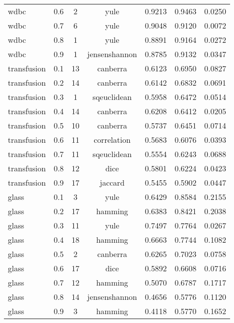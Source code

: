 \begin{table}[ht]
\begin{tabular}{lcccccc}
wdbc & 0.6 & 2 & yule & 0.9213 & 0.9463 & 0.0250 \\
wdbc & 0.7 & 6 & yule & 0.9048 & 0.9120 & 0.0072 \\
wdbc & 0.8 & 1 & yule & 0.8891 & 0.9164 & 0.0272 \\
wdbc & 0.9 & 1 & jensenshannon & 0.8785 & 0.9132 & 0.0347 \\
transfusion & 0.1 & 13 & canberra & 0.6123 & 0.6950 & 0.0827 \\
transfusion & 0.2 & 14 & canberra & 0.6142 & 0.6832 & 0.0691 \\
transfusion & 0.3 & 1 & sqeuclidean & 0.5958 & 0.6472 & 0.0514 \\
transfusion & 0.4 & 14 & canberra & 0.6208 & 0.6412 & 0.0205 \\
transfusion & 0.5 & 10 & canberra & 0.5737 & 0.6451 & 0.0714 \\
transfusion & 0.6 & 11 & correlation & 0.5683 & 0.6076 & 0.0393 \\
transfusion & 0.7 & 11 & sqeuclidean & 0.5554 & 0.6243 & 0.0688 \\
transfusion & 0.8 & 12 & dice & 0.5801 & 0.6224 & 0.0423 \\
transfusion & 0.9 & 17 & jaccard & 0.5455 & 0.5902 & 0.0447 \\
glass & 0.1 & 3 & yule & 0.6429 & 0.8584 & 0.2155 \\
glass & 0.2 & 17 & hamming & 0.6383 & 0.8421 & 0.2038 \\
glass & 0.3 & 11 & yule & 0.7497 & 0.7764 & 0.0267 \\
glass & 0.4 & 18 & hamming & 0.6663 & 0.7744 & 0.1082 \\
glass & 0.5 & 2 & canberra & 0.6265 & 0.7023 & 0.0758 \\
glass & 0.6 & 17 & dice & 0.5892 & 0.6608 & 0.0716 \\
glass & 0.7 & 12 & hamming & 0.5070 & 0.6787 & 0.1717 \\
glass & 0.8 & 14 & jensenshannon & 0.4656 & 0.5776 & 0.1120 \\
glass & 0.9 & 3 & hamming & 0.4118 & 0.5770 & 0.1652 \\
\hline
\end{tabular}
\end{table}